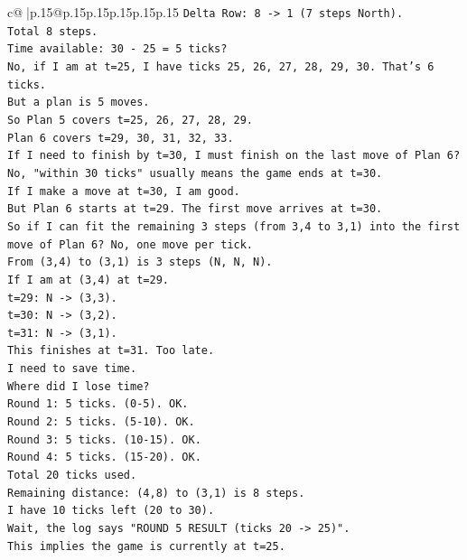 \documentclass{article}
\begin{document}
{\begin{supertabular}{c@{$\;$}|p{.15\linewidth}@{}p{.15\linewidth}p{.15\linewidth}p{.15\linewidth}p{.15\linewidth}p{.15\linewidth}}
{{{\texttt{Delta Row: 8 {-}> 1 (7 steps North).} \\
\texttt{Total 8 steps.} \\
\texttt{Time available: 30 {-} 25 = 5 ticks?} \\
\texttt{No, if I am at t=25, I have ticks 25, 26, 27, 28, 29, 30. That's 6 ticks.} \\
\texttt{But a plan is 5 moves.} \\
\texttt{So Plan 5 covers t=25, 26, 27, 28, 29.} \\
\texttt{Plan 6 covers t=29, 30, 31, 32, 33.} \\
\texttt{If I need to finish by t=30, I must finish on the last move of Plan 6?} \\
\texttt{No, "within 30 ticks" usually means the game ends at t=30.} \\
\texttt{If I make a move at t=30, I am good.} \\
\texttt{But Plan 6 starts at t=29. The first move arrives at t=30.} \\
\texttt{So if I can fit the remaining 3 steps (from 3,4 to 3,1) into the first move of Plan 6? No, one move per tick.} \\
\texttt{From (3,4) to (3,1) is 3 steps (N, N, N).} \\
\texttt{If I am at (3,4) at t=29.} \\
\texttt{t=29: N {-}> (3,3).} \\
\texttt{t=30: N {-}> (3,2).} \\
\texttt{t=31: N {-}> (3,1).} \\
\texttt{This finishes at t=31. Too late.} \\
\texttt{I need to save time.} \\
\texttt{Where did I lose time?} \\
\texttt{Round 1: 5 ticks. (0{-}5). OK.} \\
\texttt{Round 2: 5 ticks. (5{-}10). OK.} \\
\texttt{Round 3: 5 ticks. (10{-}15). OK.} \\
\texttt{Round 4: 5 ticks. (15{-}20). OK.} \\
\texttt{Total 20 ticks used.} \\
\texttt{Remaining distance: (4,8) to (3,1) is 8 steps.} \\
\texttt{I have 10 ticks left (20 to 30).} \\
\texttt{Wait, the log says "ROUND 5 RESULT (ticks 20 {-}> 25)".} \\
\texttt{This implies the game is currently at t=25.} \\
}}}
\end{supertabular}}
\end{document}
